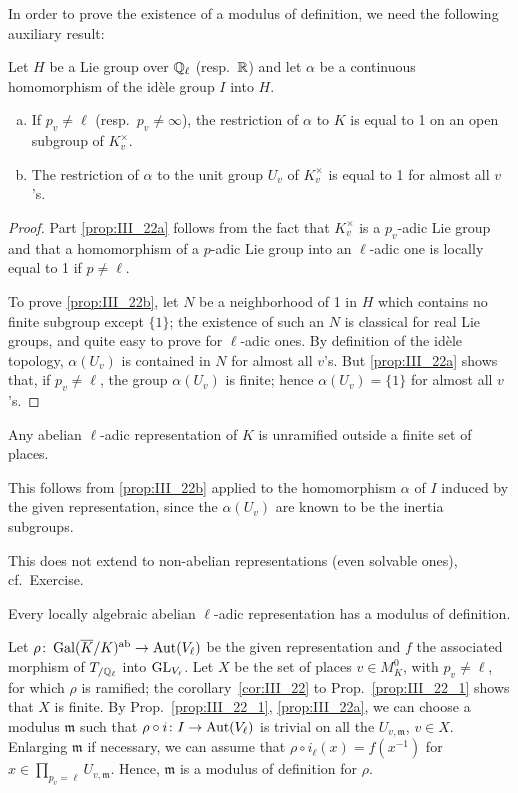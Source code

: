 In order to prove the existence of a modulus of definition, we
need the following auxiliary result:
\begin{prop}\label{prop:III_22_1}
Let $H$ be a Lie group over $\mathbb{Q}_\ell$ (resp.\ $\mathbb{R}$) and let
$\alpha$ be a continuous homomorphism of the idèle group $I$ into $H$.
\begin{enumerate}[(a)]
\item\label{prop:III_22a}
	If $p_v \ne \ell$ (resp.\ $p_v \ne \infty$), the restriction of
	$\alpha$ to $K$ is equal to 1 on an open subgroup of $K_v^\times$.
\item\label{prop:III_22b}
	The restriction of $\alpha$ to the unit group $U_v$ of $K_v^\times$ is
	equal to 1 for almost all $v$'s.
\end{enumerate}
\end{prop}
\begin{proof}
	Part \ref{prop:III_22a} follows from the fact that $K_v^\times$ is a
	$p_v$-adic Lie group and that a homomorphism of a $p$-adic Lie group
	into an $\ell$-adic one is locally equal to 1 if $p \ne \ell$.

	To prove \ref{prop:III_22b}, let $N$ be a neighborhood of 1 in $H$
	which contains no finite subgroup except $\{ 1 \}$; the existence of
	such an $N$ is classical for real Lie groups, and quite easy to prove
	for $\ell$-adic ones. By definition of the idèle topology,
	$\alpha(U_v)$ is contained in $N$ for almost all $v$'s. But
	\ref{prop:III_22a} shows that, if $p_v \ne \ell$, the group
	\dpage
	$\alpha(U_v)$ is finite; hence $\alpha(U_v) = \{ 1 \}$ for almost all
	$v$'s.
\end{proof}

\begin{corp}\label{cor:III_22}
	Any abelian $\ell$-adic representation of $K$ is unramified outside a
	finite set of places.
\end{corp}
This follows from \ref{prop:III_22b} applied to the homomorphism $\alpha$ of $I$
induced by the given representation, since the $\alpha(U_v)$ are known to be
the inertia subgroups.

\begin{obs}
This does not extend to non-abelian representations (even solvable ones), cf.\ Exercise.
\end{obs}
\begin{prop}
	Every locally algebraic abelian $\ell$-adic representation has a
	modulus of definition.
\end{prop}
Let $\rho\colon \operatorname{Gal}(\overline{K}/K)^{\mathrm{ab}} \to \operatorname{Aut}(V_\ell)$ be the given
representation and $f$ the associated morphism of $T_{/\mathbb{Q}_\ell}$ into
$\operatorname{GL}_{V_\ell}$. Let $X$ be the set of places $v \in M_K^0$, with $p_v \ne
\ell$, for which $\rho$ is ramified; the corollary~\ref{cor:III_22} to
Prop.~\ref{prop:III_22_1} shows that $X$ is finite. By
Prop.~\ref{prop:III_22_1}, \ref{prop:III_22a}, we can choose a modulus
$\mathfrak{m}$ such that $\rho \circ i\colon I \to \operatorname{Aut}(V_\ell)$ is trivial on
all the $U_{v, \mathfrak{m}}$, $v \in X$. Enlarging $\mathfrak{m}$ if
necessary, we can assume that $\rho \circ i_\ell(x) = f(x^{-1})$ for $x \in
\prod_{p_v = \ell} U_{v, \mathfrak{m}}$. Hence, $\mathfrak{m}$ is a modulus of
definition for $\rho$.

